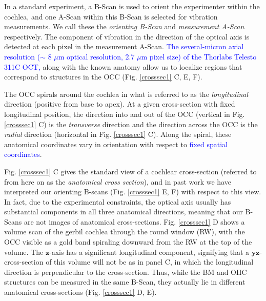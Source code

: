 \documentclass[preprint,NumberedRefs]{JASA}
\begin{document}
\par{In a standard experiment, a B-Scan is used to orient the experimenter within the cochlea, and one A-Scan within this B-Scan is selected for vibration measurements. We call these the \textit{orienting B-Scan} and \textit{measurement A-Scan} respectively. The component of vibration in the direction of the optical axis is detected at each pixel in the measurement A-Scan. \textcolor{blue}{The several-micron axial resolution ($\sim$ 8 $\mu$m optical resolution, 2.7 $\mu$m pixel size) of the Thorlabs Telesto 311C OCT,} along with the known anatomy allow us to localize regions that correspond to structures in the OCC (Fig. \ref{crosssec1} C, E, F).}
\par{The OCC spirals around the cochlea in what is referred to as the \textit{longitudinal} direction (positive from base to apex).  At a given cross-section with fixed longitudinal position, the direction into and out of the OCC (vertical in Fig. \ref{crosssec1} C) is the \textit{transverse} direction and the direction across the OCC is the \textit{radial} direction (horizontal in Fig. \ref{crosssec1} C).  Along the spiral, these anatomical coordinates vary in orientation with respect to \textcolor{blue}{fixed spatial coordinates}. }
\par{Fig. \ref{crosssec1} C gives the standard view of a cochlear cross-section (referred to from here on as the \textit{anatomical cross section}), and in past work we have interpreted our orienting B-scans (Fig. \ref{crosssec1} E, F) with respect to this view. In fact, due to the experimental constraints, the optical axis usually has substantial components in all three anatomical directions, meaning that our B-Scans are not images of anatomical cross-sections.  Fig. \ref{crosssec1} D shows a volume scan of the gerbil cochlea through the round window (RW), with the OCC visible as a gold band spiraling downward from the RW at the top of the volume. The $\mathbf{z}$-axis has a significant longitudinal component, signifying that a $\mathbf{yz}$-cross-section of this volume will not be as in panel C, in which the longitudinal direction is perpendicular to the cross-section. Thus, while the BM and OHC structures can be measured in the same B-Scan, they actually lie in different anatomical cross-sections (Fig. \ref{crosssec1} D, E). }
\end{document}
